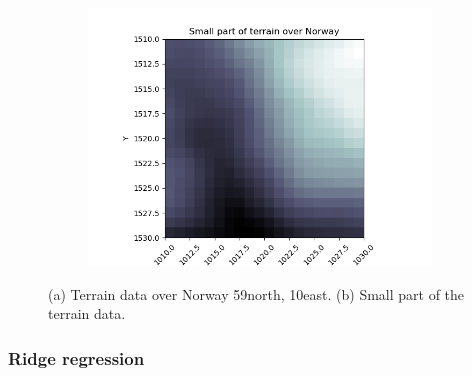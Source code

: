 \documentclass[../main.tex]{subfiles}
\begin{document}
\begin{figure}[htb]
\begin{subfigure}[b]{0.45\textwidth}
    \caption{}
    \label{fig:terrain_Norway}
   \end{subfigure}
   \quad
   \begin{subfigure}[b]{0.45\textwidth}
    \centering
    \includegraphics[width=\textwidth]{../assets/part_of_terrain.png} 
    \caption{}
   \end{subfigure}
   \caption{(a) Terrain data over Norway 59\degree north, 10\degree east. (b) Small part of the terrain data.}
\end{figure} 

\subsubsection{Ridge regression}
\end{document}
